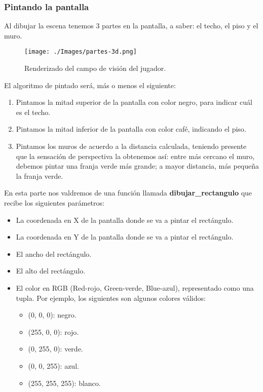 

\subsubsection{Pintando la pantalla}


Al dibujar la escena tenemos 3 partes en la pantalla, a saber: el techo, el piso y el muro.

\begin{figure}[h!]
	\centering
	\texttt{[image: ./Images/partes-3d.png]}
	\caption{Renderizado del campo de visión del jugador.}
	\label{partes-3d}
\end{figure}

El algoritmo de pintado será, más o menos el siguiente: 

\begin{enumerate}
\item Pintamos la mitad superior de la pantalla con color negro, para indicar cuál es el techo.
\item Pintamos la mitad inferior de la pantalla con color café, indicando el piso.
\item Pintamos los muros de acuerdo a la distancia calculada, teniendo presente que la sensación de perspectiva la obtenemos así: entre más cercano el muro, debemos pintar una franja verde más grande; a mayor distancia, más pequeña la franja verde.
\end{enumerate}

En esta parte nos valdremos de una función llamada \textbf{dibujar\_rectangulo} que recibe los siguientes parámetros:

\begin{itemize}
\item La coordenada en X de la pantalla donde se va a pintar el rectángulo.
\item La coordenada en Y de la pantalla donde se va a pintar el rectángulo.
\item El ancho del rectángulo.
\item El alto del rectángulo.
\item El color en RGB (Red-rojo, Green-verde, Blue-azul), representado como una tupla. Por ejemplo, los siguientes son algunos colores válidos:
	\begin{itemize}
	\item (0, 0, 0): negro.
	\item (255, 0, 0): rojo.
	\item (0, 255, 0): verde.
	\item (0, 0, 255): azul.
	\item (255, 255, 255): blanco.
	\end{itemize}
\end{itemize}

